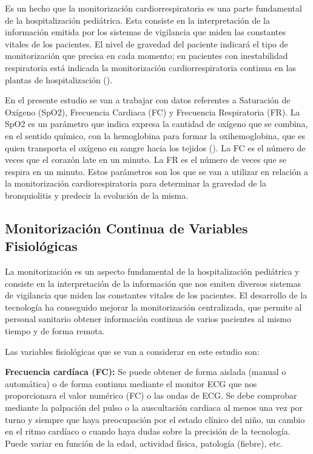 Es un hecho que la monitorización cardiorrespiratoria es una parte fundamental de la hospitalización pediátrica. Esta consiste en la interpretación de la información emitida por los sistemas de vigilancia que miden las constantes vitales de los pacientes. El nivel de gravedad del paciente indicará el tipo de monitorización que precisa en cada momento; en pacientes con inestabilidad respiratoria está indicada la monitorización cardiorrespiratoria continua en las plantas de hospitalización (\cite{AmandaC}).

En el presente estudio se van a trabajar con datos referentes a Saturación de Oxígeno (SpO2), Frecuencia Cardiaca (FC) y Frecuencia Respiratoria (FR). La SpO2 es un parámetro que indica expresa la cantidad de oxígeno que se combina, en el sentido químico, con la hemoglobina para formar la oxihemoglobina, que es quien transporta el oxígeno en sangre hacia los tejidos (\cite{Laborde2004}). La FC es el número de veces que el corazón late en un minuto. La FR es el número de veces que se respira en un minuto. Estos parámetros son los que se van a utilizar en relación a la monitorización cardiorespiratoria para determinar la gravedad de la bronquiolitis y predecir la evolución de la misma.

\subsection{Monitorización Continua de Variables Fisiológicas}

La monitorización es un aspecto fundamental de la hospitalización pediátrica y consiste en la interpretación de la información que nos emiten diversos sistemas de vigilancia que miden las constantes vitales de los pacientes. El desarrollo de la tecnología ha conseguido mejorar la monitorización centralizada, que permite al personal sanitario obtener información continua de varios pacientes al mismo tiempo y de forma remota.

Las variables fisiológicas que se van a considerar en este estudio son: 

\textbf{Frecuencia cardíaca (FC):} Se puede obtener de forma aislada (manual o automática) o de forma continua mediante el monitor ECG que nos proporcionara el valor numérico (FC) o las ondas de ECG. Se debe comprobar mediante la palpación del pulso o la auscultación cardiaca al menos una vez por turno y siempre que haya preocupación por el estado clínico del niño, un cambio en el ritmo cardíaco o cuando haya dudas sobre la precisión de la tecnología. Puede variar en función de la edad, actividad física, patología (fiebre), etc. 

